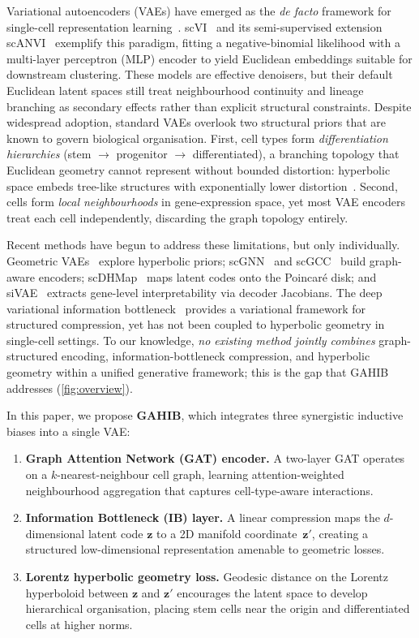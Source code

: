 \documentclass[preprint,12pt]{elsarticle}
\newcommand{\bz}{\mathbf{z}}
\begin{document}
Variational autoencoders (VAEs) have emerged as the \emph{de facto}
framework for single-cell representation
learning~\cite{lopez2018deep,gronbech2020scvae}.
scVI~\cite{lopez2018deep} and its semi-supervised extension
scANVI~\cite{xu2021scanvi} exemplify this paradigm, fitting a
negative-binomial likelihood with a multi-layer perceptron (MLP) encoder to
yield Euclidean embeddings suitable for downstream clustering.
These models are effective denoisers, but their default Euclidean latent
spaces still treat neighbourhood continuity and lineage branching as
secondary effects rather than explicit structural constraints.
Despite widespread adoption, standard VAEs overlook two structural priors
that are known to govern biological organisation.
First, cell types form \emph{differentiation hierarchies}
(stem $\to$ progenitor $\to$ differentiated), a branching topology that
Euclidean geometry cannot represent without bounded distortion:
hyperbolic space embeds tree-like structures with exponentially lower
distortion~\cite{nickel2017poincare,ganea2018hyperbolic}.
Second, cells form \emph{local neighbourhoods} in gene-expression space,
yet most VAE encoders treat each cell independently, discarding the graph
topology entirely.

Recent methods have begun to address these limitations, but only
individually.
Geometric VAEs~\cite{bayer2023gmvae} explore hyperbolic priors;
scGNN~\cite{wang2021scgnn} and scGCC~\cite{tian2023scgcc} build
graph-aware encoders;
scDHMap~\cite{tian2023scdhmap} maps latent codes onto the Poincar\'{e}
disk;
and siVAE~\cite{choi2023sivae} extracts gene-level interpretability via
decoder Jacobians.
The deep variational information bottleneck~\cite{alemi2017deep} provides
a variational framework for structured compression, yet has not been
coupled to hyperbolic geometry in single-cell settings.
To our knowledge, \emph{no existing method jointly combines}
graph-structured encoding, information-bottleneck compression, and
hyperbolic geometry within a unified generative framework; this is the
gap that GAHIB addresses (\cref{fig:overview}).

In this paper, we propose \textbf{GAHIB}, which integrates three
synergistic inductive biases into a single VAE:
\begin{enumerate}[leftmargin=*,itemsep=2pt]
\item \textbf{Graph Attention Network (GAT) encoder.}
  A two-layer GAT operates on a $k$-nearest-neighbour cell graph,
  learning attention-weighted neighbourhood aggregation that captures
  cell-type-aware interactions.
\item \textbf{Information Bottleneck (IB) layer.}
  A linear compression maps the $d$-dimensional latent code $\bz$ to a
  2D manifold coordinate~$\bz'$, creating a structured low-dimensional
  representation amenable to geometric losses.
\item \textbf{Lorentz hyperbolic geometry loss.}
  Geodesic distance on the Lorentz hyperboloid between $\bz$ and $\bz'$
  encourages the latent space to develop hierarchical organisation,
  placing stem cells near the origin and differentiated cells at higher
  norms.
\end{enumerate}
\end{document}
